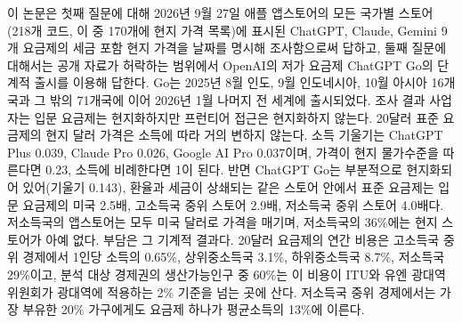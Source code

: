 \documentclass[11pt]{article}
\theoremstyle{definition}
\theoremstyle{remark}
\begin{document}
이 논문은 첫째 질문에 대해 2026년 9월 27일 애플 앱스토어의 모든 국가별 스토어(218개 코드, 이 중 170개에 현지 가격 목록)에 표시된 ChatGPT, Claude, Gemini 9개 요금제의 세금 포함 현지 가격을 날짜를 명시해 조사함으로써 답하고, 둘째 질문에 대해서는 공개 자료가 허락하는 범위에서 OpenAI의 저가 요금제 ChatGPT Go의 단계적 출시를 이용해 답한다. Go는 2025년 8월 인도, 9월 인도네시아, 10월 아시아 16개국과 그 밖의 71개국에 이어 2026년 1월 나머지 전 세계에 출시되었다. 조사 결과 사업자는 입문 요금제는 현지화하지만 프런티어 접근은 현지화하지 않는다. 20달러 표준 요금제의 현지 달러 가격은 소득에 따라 거의 변하지 않는다. 소득 기울기는 ChatGPT Plus 0.039, Claude Pro 0.026, Google AI Pro 0.037이며, 가격이 현지 물가수준을 따른다면 0.23, 소득에 비례한다면 1이 된다. 반면 ChatGPT Go는 부분적으로 현지화되어 있어(기울기 0.143), 환율과 세금이 상쇄되는 같은 스토어 안에서 표준 요금제는 입문 요금제의 미국 2.5배, 고소득국 중위 스토어 2.9배, 저소득국 중위 스토어 4.0배다. 저소득국의 앱스토어는 모두 미국 달러로 가격을 매기며, 저소득국의 36\%에는 현지 스토어가 아예 없다. 부담은 그 기계적 결과다. 20달러 요금제의 연간 비용은 고소득국 중위 경제에서 1인당 소득의 0.65\%, 상위중소득국 3.1\%, 하위중소득국 8.7\%, 저소득국 29\%이고, 분석 대상 경제권의 생산가능인구 중 60\%는 이 비용이 ITU와 유엔 광대역위원회가 광대역에 적용하는 2\% 기준을 넘는 곳에 산다. 저소득국 중위 경제에서는 가장 부유한 20\% 가구에게도 요금제 하나가 평균소득의 13\%에 이른다.
\end{document}
